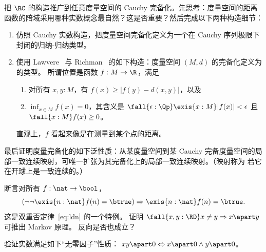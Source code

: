 \begin{ex} \label{ex:metric-completion}
  把 $\RC$ 的构造推广到任意度量空间的 Cauchy 完备化。先思考：度量空间的距离函数的陪域采用哪种实数概念最自然？这是否重要？然后完成以下两种构造细节：
  \begin{enumerate}
  \item 仿照 Cauchy 实数构造，把度量空间完备化定义为一个在 Cauchy 序列极限下封闭的归纳-归纳类型。
  \item 使用 Lawvere~\cite{lawvere:metric-spaces} 与 Richman~\cite{Richman00thefundamental} 的如下构造：度量空间 $(M, d)$ 的完备化定义为的类型。
    所谓位置是函数 $f : M \to \R$，满足
    \begin{enumerate}
    \item 对所有 $x, y : M$，有 $f(x) \geq |f(y) - d(x,y)|$，以及
    \item $\inf_{x \in M} f(x) = 0$，其含义是 $\fall{\epsilon : \Qp} \exis{x : M} |f(x)| < \epsilon$ 且 $\fall{x : M} f(x) \geq 0$。
    \end{enumerate}
    直观上，$f$ 看起来像是在测量到某个点的距离。
  \end{enumerate}
  最后证明度量完备化的如下泛性质：从某度量空间到某 Cauchy 完备度量空间的局部一致连续映射，可唯一扩张为其完备化上的局部一致连续映射。（映射称为
  若它在开球上是一致连续的。）
\end{ex}

%

\begin{ex} \label{ex:reals-apart-neq-MP}
  断言对所有 $f : \nat \to \bool$，
  \begin{equation*}
    (\lnot \lnot \exis{n : \nat} f(n) = \btrue)
    \Rightarrow
    \exis{n : \nat} f(n) = \btrue.
  \end{equation*}
  这是双重否定律~\eqref{eq:ldn} 的一个特例。
  证明
  $\fall{x, y: \RD} x \neq y \Rightarrow x \apart y$ 可推出 Markov 原理。
  反向是否也成立？
\end{ex}

\begin{ex} \label{ex:reals-apart-zero-divisors}
  验证实数满足如下“无零因子”性质：
  $x y \apart 0 \Leftrightarrow x \apart 0 \land y \apart 0$。
\end{ex}

